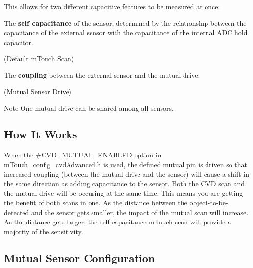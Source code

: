 This allows for two different capacitive features to be measured at once\+: 
\begin{DoxyItemize}
\item The {\bfseries self capacitance} of the sensor, determined by the relationship between the capacitance of the external sensor with the capacitance of the internal A\+D\+C hold capacitor. 
\begin{DoxyItemize}
\item (Default m\+Touch Scan) 
\end{DoxyItemize}
\item The {\bfseries coupling} between the external sensor and the mutual drive. 
\begin{DoxyItemize}
\item (Mutual Sensor Drive) 
\end{DoxyItemize}
\end{DoxyItemize}\begin{DoxyNote}{Note}
One mutual drive can be shared among all sensors. 
\end{DoxyNote}
\hypertarget{feat_mutual_featMutual-How}{}\subsection{How It Works}\label{feat_mutual_featMutual-How}
When the \#\+C\+V\+D\+\_\+\+M\+U\+T\+U\+A\+L\+\_\+\+E\+N\+A\+B\+L\+E\+D option in \hyperlink{m_touch__config__cvd_advanced_8h}{m\+Touch\+\_\+config\+\_\+cvd\+Advanced.\+h} is used, the defined mutual pin is driven so that increased coupling (between the mutual drive and the sensor) will cause a shift in the same direction as adding capacitance to the sensor. Both the C\+V\+D scan and the mutual drive will be occuring at the same time. This means you are getting the benefit of both scans in one. As the distance between the object-\/to-\/be-\/detected and the sensor gets smaller, the impact of the mutual scan will increase. As the distance gets larger, the self-\/capacitance m\+Touch scan will provide a majority of the sensitivity.

 \hypertarget{feat_mutual_featMutual-Config}{}\subsection{Mutual Sensor Configuration}\label{feat_mutual_featMutual-Config}

